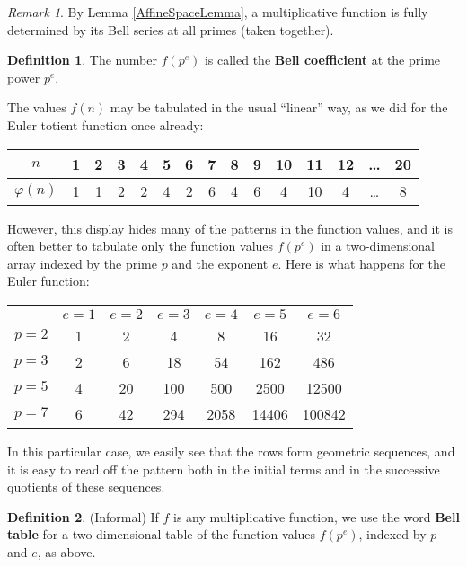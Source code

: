 \documentclass[a4paper]{article}
\theoremstyle{definition}
\newtheorem{definition}{Definition}[section]
\theoremstyle{remark}
\newtheorem*{remark}{Remark}
\newcommand{\defhl}[1]{\textbf{#1}}
\begin{document}
\begin{remark}
By Lemma \ref{AffineSpaceLemma}, a multiplicative function is fully determined by its Bell series at all primes (taken together).
\end{remark}

\begin{definition}
The number $f(p^e)$ is called the \defhl{Bell coefficient} at the prime power $p^e$.
\end{definition}

The values $f(n)$ may be tabulated in the usual ``linear'' way, as we did for the Euler totient function once already:

\vspace{6pt}
\begin{tabular}{  | c || c | c | c | c | c | c | c | c | c | c | c | c | c | c |  }
  \hline			
  $n$ & 1 & 2 & 3 & 4 & 5 & 6 & 7 & 8 & 9 & 10 & 11 & 12 & \ldots & 20  \\
  \hline
  $\varphi(n) $ & 1 & 1 & 2 & 2 & 4 & 2 & 6 & 4 & 6 & 4 & 10 & 4 & \ldots & 8  \\
  \hline  
\end{tabular}
\vspace{6pt}

However, this display hides many of the patterns in the function values, and it is often better to tabulate only the function values $f(p^e)$ in a two-dimensional array indexed by the prime $p$ and the exponent $e$. Here is what happens for the Euler function:

\begin{center}
\begin{tabular}{| l | | c | c | c | c | c | c |}
\hline
& $e = 1$ & $e = 2$ & $e = 3$ & $e = 4$ & $e = 5$ & $e = 6$ \\
\hline
\hline
$p = 2$ & 1 & 2 & 4 & 8 & 16 & 32 \\
\hline
$p = 3$ & 2 & 6 & 18 & 54 & 162 & 486 \\
\hline
$p = 5$ & 4 & 20 & 100 & 500 & 2500 & 12500 \\
\hline
$p = 7$ & 6 & 42 & 294 & 2058 & 14406 & 100842 \\
\hline
\end{tabular}
\end{center}

In this particular case, we easily see that the rows form geometric sequences, and it is easy to read off the pattern both in the initial terms and in the successive quotients of these sequences. 

\begin{definition}
(Informal) If $f$ is any multiplicative function, we use the word \defhl{Bell table} for a two-dimensional table of the function values $f(p^e)$, indexed by $p$ and $e$, as above.
\end{definition}
\end{document}
